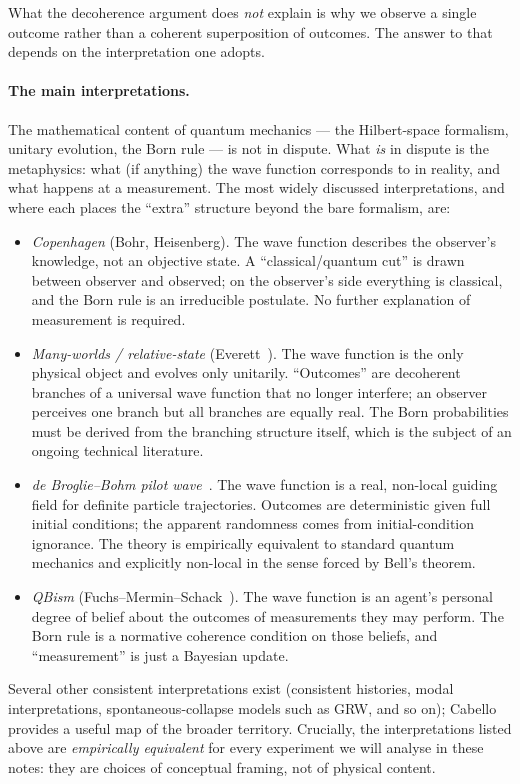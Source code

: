 What the decoherence argument does \emph{not} explain is why we
observe a single outcome rather than a coherent superposition of
outcomes. The answer to that depends on the interpretation one
adopts.

\paragraph{The main interpretations.}
The mathematical content of quantum mechanics --- the Hilbert-space
formalism, unitary evolution, the Born rule --- is not in dispute.
What \emph{is} in dispute is the metaphysics: what (if anything)
the wave function corresponds to in reality, and what happens at a
measurement. The most widely discussed interpretations, and where
each places the ``extra'' structure beyond the bare formalism,
are:
\begin{itemize}
  \item \emph{Copenhagen} (Bohr, Heisenberg).
  The wave function describes the observer's knowledge, not an
  objective state. A ``classical/quantum cut'' is drawn between
  observer and observed; on the observer's side everything is
  classical, and the Born rule is an irreducible postulate. No
  further explanation of measurement is required.
  \item \emph{Many-worlds / relative-state} (Everett~\cite{everett1957}).
  The wave function is the only physical object and evolves only
  unitarily. ``Outcomes'' are decoherent branches of a universal
  wave function that no longer interfere; an observer perceives
  one branch but all branches are equally real. The Born
  probabilities must be derived from the branching structure
  itself, which is the subject of an ongoing technical literature.
  \item \emph{de Broglie--Bohm pilot wave}~\cite{bohm1952}.
  The wave function is a real, non-local guiding field for definite
  particle trajectories. Outcomes are deterministic given full
  initial conditions; the apparent randomness comes from
  initial-condition ignorance. The theory is empirically equivalent
  to standard quantum mechanics and explicitly non-local in the
  sense forced by Bell's theorem.
  \item \emph{QBism} (Fuchs--Mermin--Schack~\cite{fuchs2014}).
  The wave function is an agent's personal degree of belief about
  the outcomes of measurements they may perform. The Born rule is a
  normative coherence condition on those beliefs, and
  ``measurement'' is just a Bayesian update.
\end{itemize}
Several other consistent interpretations exist (consistent
histories, modal interpretations, spontaneous-collapse models such
as GRW, and so on); Cabello~\cite{cabello2017} provides a useful
map of the broader territory. Crucially, the interpretations listed
above are \emph{empirically equivalent} for every experiment we
will analyse in these notes: they are choices of conceptual framing,
not of physical content.


